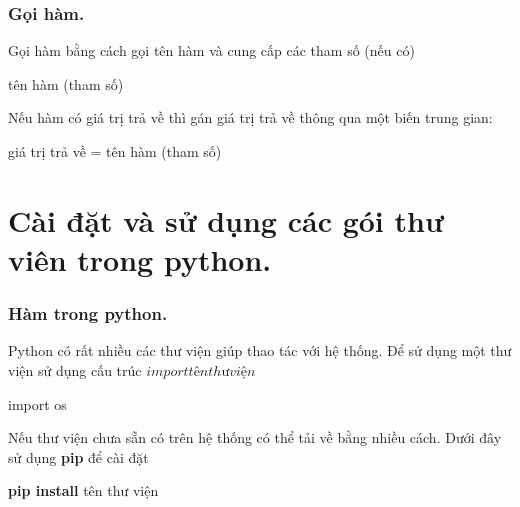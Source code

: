\documentclass{beamer}
\begin{document}
\begin{frame}[label=goiham]
\frametitle{Gọi hàm.}

Gọi hàm bằng cách gọi tên hàm và cung cấp các tham số (nếu có)

\begin{example}
tên hàm (tham số)
\end{example}

Nếu hàm có giá trị trả về thì gán giá trị trả về thông qua một biến trung gian:

\begin{example}
giá trị trả về = tên hàm (tham số)
\end{example}

\hyperlink{ham}{}
\end{frame}


\section{Cài đặt và sử dụng các gói thư viên trong python.}
\begin{frame}[label=goithuvien]
\frametitle{Hàm trong python.}

Python có rất nhiều các thư viện giúp thao tác với hệ thống. Để sử dụng một thư viện sử dụng cấu trúc $import tên thư viện$
\begin{example}
import os
\end{example}

Nếu thư viện chưa sẵn có trên hệ thống có thể tải về bằng nhiều cách. Dưới đây sử dụng \textbf{pip} để cài đặt

\begin{example}
\textbf{pip install} tên thư viện
\end{example}
\end{frame}
\end{document}
